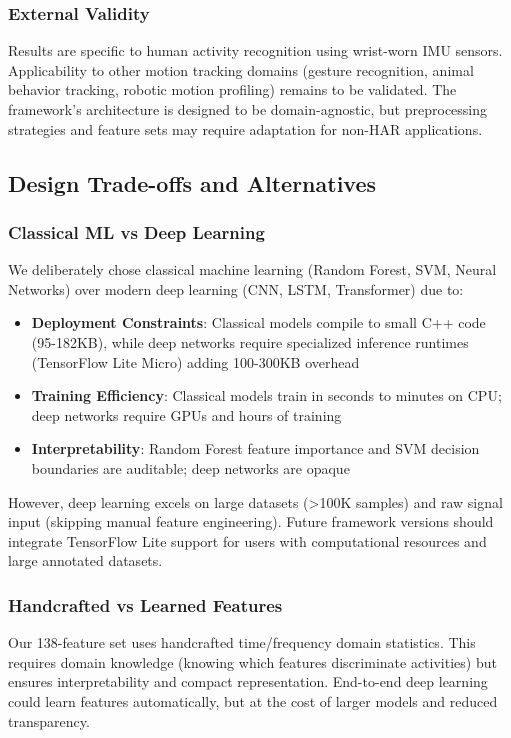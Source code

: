 \subsubsection{External Validity}
Results are specific to human activity recognition using wrist-worn IMU sensors. Applicability to other motion tracking domains (gesture recognition, animal behavior tracking, robotic motion profiling) remains to be validated. The framework's architecture is designed to be domain-agnostic, but preprocessing strategies and feature sets may require adaptation for non-HAR applications.

\subsection{Design Trade-offs and Alternatives}

\subsubsection{Classical ML vs Deep Learning}
We deliberately chose classical machine learning (Random Forest, SVM, Neural Networks) over modern deep learning (CNN, LSTM, Transformer) due to:
\begin{itemize}
    \item \textbf{Deployment Constraints}: Classical models compile to small C++ code (95-182KB), while deep networks require specialized inference runtimes (TensorFlow Lite Micro) adding 100-300KB overhead
    \item \textbf{Training Efficiency}: Classical models train in seconds to minutes on CPU; deep networks require GPUs and hours of training
    \item \textbf{Interpretability}: Random Forest feature importance and SVM decision boundaries are auditable; deep networks are opaque
\end{itemize}

However, deep learning excels on large datasets (>100K samples) and raw signal input (skipping manual feature engineering). Future framework versions should integrate TensorFlow Lite support for users with computational resources and large annotated datasets.

\subsubsection{Handcrafted vs Learned Features}
Our 138-feature set uses handcrafted time/frequency domain statistics. This requires domain knowledge (knowing which features discriminate activities) but ensures interpretability and compact representation. End-to-end deep learning could learn features automatically, but at the cost of larger models and reduced transparency.

